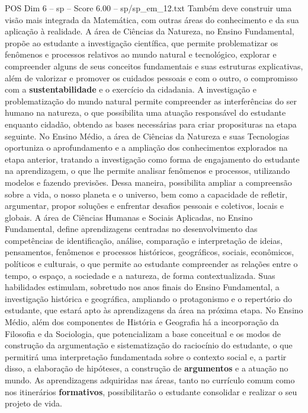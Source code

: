 \begin{textsample}{POS Dim 6 – sp – Score 6.00 – sp/sp\_em\_12.txt}
Também deve construir uma visão mais integrada da Matemática, com outras áreas do conhecimento e da sua aplicação à realidade.
A área de Ciências da Natureza, no Ensino Fundamental, propõe ao estudante a investigação científica, que permite problematizar os fenômenos e processos relativos ao mundo natural e tecnológico, explorar e compreender alguns de seus conceitos fundamentais e suas estruturas explicativas, além de valorizar e promover os cuidados pessoais e com o outro, o compromisso com a \textbf{sustentabilidade} e o exercício da cidadania.
A investigação e problematização do mundo natural permite compreender as interferências do ser humano na natureza, o que possibilita uma atuação responsável do estudante enquanto cidadão, obtendo as bases necessárias para criar proposituras na etapa seguinte.
No Ensino Médio, a área de Ciências da Natureza e suas Tecnologias oportuniza o aprofundamento e a ampliação dos conhecimentos explorados na etapa anterior, tratando a investigação como forma de engajamento do estudante na aprendizagem, o que lhe permite analisar fenômenos e processos, utilizando modelos e fazendo previsões.
Dessa maneira, possibilita ampliar a compreensão sobre a vida, o nosso planeta e o universo, bem como a capacidade de refletir, argumentar, propor soluções e enfrentar desafios pessoais e coletivos, locais e globais.
A área de Ciências Humanas e Sociais Aplicadas, no Ensino Fundamental, define aprendizagens centradas no desenvolvimento das competências de identificação, análise, comparação e interpretação de ideias, pensamentos, fenômenos e processos históricos, geográficos, sociais, econômicos, políticos e culturais, o que permite ao estudante compreender as relações entre o tempo, o espaço, a sociedade e a natureza, de forma contextualizada.
Suas habilidades estimulam, sobretudo nos anos finais do Ensino Fundamental, a investigação histórica e geográfica, ampliando o protagonismo e o repertório do estudante, que estará apto às aprendizagens da área na próxima etapa.
No Ensino Médio, além dos componentes de História e Geografia há a incorporação da Filosofia e da Sociologia, que potencializam a base conceitual e os modos de construção da argumentação e sistematização do raciocínio do estudante, o que permitirá uma interpretação fundamentada sobre o contexto social e, a partir disso, a elaboração de hipóteses, a construção de \textbf{argumentos} e a atuação no mundo.
As aprendizagens adquiridas nas áreas, tanto no currículo comum como nos itinerários \textbf{formativos}, possibilitarão o estudante consolidar e realizar o seu projeto de vida.

\end{textsample}
